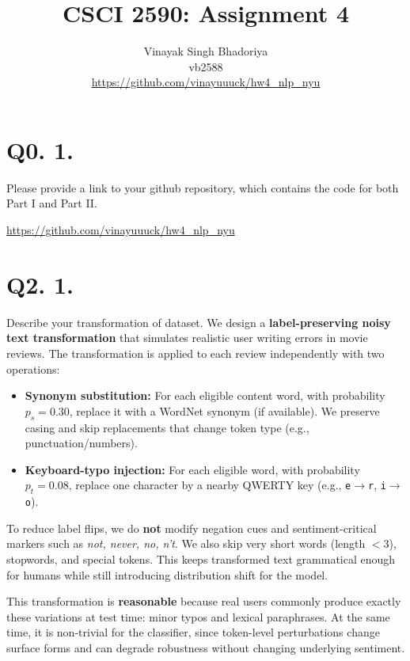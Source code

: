 \documentclass{article}
\title{CSCI 2590: Assignment 4}
\author{Vinayak Singh Bhadoriya\\ vb2588 \\ \url{https://github.com/vinayuuuck/hw4_nlp_nyu}}
\date{}
\begin{document}
\maketitle
\section*{Q0. 1.}
Please provide a link to your github repository, which contains the
code for both Part I and Part II. 

\url{https://github.com/vinayuuuck/hw4_nlp_nyu}

\section*{Q2. 1.}
Describe your transformation of dataset.
We design a \textbf{label-preserving noisy text transformation} that
simulates realistic user writing errors in movie reviews. The
transformation is applied to each review independently with two operations:

\begin{itemize}
  \item \textbf{Synonym substitution:} For each eligible content
    word, with probability $p_s=0.30$, replace it with a WordNet
    synonym (if available). We preserve casing and skip replacements
    that change token type (e.g., punctuation/numbers).
  \item \textbf{Keyboard-typo injection:} For each eligible word,
    with probability $p_t=0.08$, replace one character by a nearby
    QWERTY key (e.g., \texttt{e}$\rightarrow$\texttt{r},
    \texttt{i}$\rightarrow$\texttt{o}).
\end{itemize}

To reduce label flips, we do \textbf{not} modify negation cues and
sentiment-critical markers such as \textit{not, never, no, n't}. We
also skip very short words (length $<3$), stopwords, and special
tokens. This keeps transformed text grammatical enough for humans
while still introducing distribution shift for the model.

This transformation is \textbf{reasonable} because real users
commonly produce exactly these variations at test time: minor typos
and lexical paraphrases. At the same time, it is non-trivial for the
classifier, since token-level perturbations change surface forms and
can degrade robustness without changing underlying sentiment.
\end{document}
